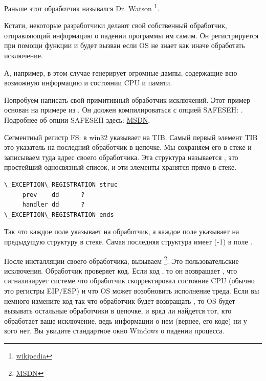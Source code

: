 Раньше этот обработчик назывался Dr. Watson
\footnote{\href{http://go.yurichev.com/17046}{wikipedia}}.

Кстати, некоторые разработчики делают свой собственный обработчик,
отправляющий информацию о падении программы им самим.
Он регистрируется при помощи функции  
и будет вызван если \ac{OS} не знает как иначе обработать исключение.

\myindex{\oracle}
А, например, \oracle в этом случае генерирует огромные дампы, 
содержащие всю возможную информацию и состоянии \ac{CPU} и памяти.

Попробуем написать свой примитивный обработчик исключений.
Этот пример основан на примере из \PietrekSEH.
Он должен компилироваться с опцией SAFESEH: .
Подробнее об опции SAFESEH здесь: \href{http://go.yurichev.com/17252}{MSDN}.
	


Сегментный регистр FS: в win32 указывает на \ac{TIB}.
Самый первый элемент \ac{TIB} это указатель на последний обработчик в цепочке.
Мы сохраняем его в стеке и записываем туда адрес своего обработчика.
Эта структура называется , 
это простейший односвязный список, и эти элементы хранятся прямо в стеке.

\begin{lstlisting}[caption=MSVC/VC/crt/src/exsup.inc]
\_EXCEPTION\_REGISTRATION struc
     prev    dd      ?
     handler dd      ?
\_EXCEPTION\_REGISTRATION ends
\end{lstlisting}

Так что каждое поле  указывает на обработчик,
а каждое поле  указывает на предыдущую структуру в стеке.
Самая последняя структура имеет  (-1) в поле .



После инсталляции своего обработчика, вызываем \footnote{\href{http://go.yurichev.com/17253}{MSDN}}.
Это пользовательские исключения. 
Обработчик проверяет код.
Если код , то он возвращает 
,
что сигнализирует системе что обработчик скорректировал состояние CPU (обычно это регистры EIP/ESP) и что \ac{OS} может
возобновить исполнение треда.
Если вы немного измените код так что обработчик будет возвращать ,
то \ac{OS} будет вызывать остальные
обработчики в цепочке, и вряд ли найдется тот, кто обработает ваше исключение,
ведь информации о нем (вернее, его коде) ни у кого нет.
Вы увидите стандартное окно Windows о падении процесса.

